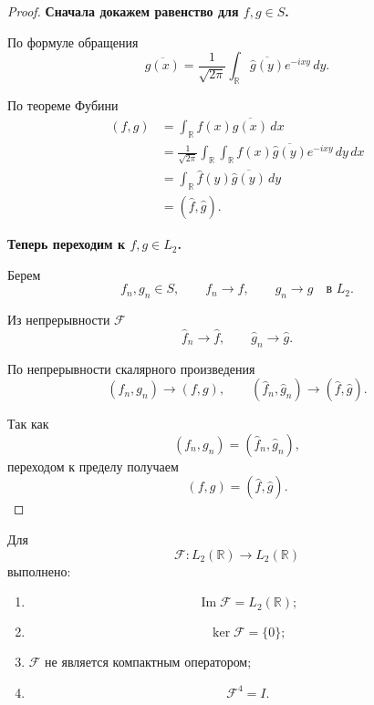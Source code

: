 \begin{proof}
	\textbf{Сначала докажем равенство для \(f,g\in S\).}
	
	По формуле обращения
	\[
	\overline{g(x)}
	=
	\frac{1}{\sqrt{2\pi}}
	\int_{\mathbb R}
	\overline{\widehat g(y)}e^{-ixy}\,dy.
	\]
	
	По теореме Фубини
	\[
	\begin{aligned}
		(f,g)
		&=
		\int_{\mathbb R}f(x)\overline{g(x)}\,dx
		\\
		&=
		\frac{1}{\sqrt{2\pi}}
		\int_{\mathbb R}\int_{\mathbb R}
		f(x)\overline{\widehat g(y)}e^{-ixy}\,dy\,dx
		\\
		&=
		\int_{\mathbb R}
		\widehat f(y)\overline{\widehat g(y)}\,dy
		\\
		&=
		(\widehat f,\widehat g).
	\end{aligned}
	\]
	
	\textbf{Теперь переходим к \(f,g\in L_2\).}
	
	Берем
	\[
	f_n,g_n\in S,
	\qquad
	f_n\to f,
	\qquad
	g_n\to g
	\quad\text{в }L_2.
	\]
	
	Из непрерывности \(\mathcal F\)
	\[
	\widehat f_n\to\widehat f,
	\qquad
	\widehat g_n\to\widehat g.
	\]
	
	По непрерывности скалярного произведения
	\[
	(f_n,g_n)\to(f,g),
	\qquad
	(\widehat f_n,\widehat g_n)
	\to
	(\widehat f,\widehat g).
	\]
	
	Так как
	\[
	(f_n,g_n)
	=
	(\widehat f_n,\widehat g_n),
	\]
	переходом к пределу получаем
	\[
	(f,g)=(\widehat f,\widehat g).
	\]
\end{proof}

\begin{theorem}
	Для
	\[
	\mathcal F:L_2(\mathbb R)\to L_2(\mathbb R)
	\]
	выполнено:
	\begin{enumerate}
		\item
		\[
		\operatorname{Im}\mathcal F=L_2(\mathbb R);
		\]
		
		\item
		\[
		\ker\mathcal F=\{0\};
		\]
		
		\item \(\mathcal F\) не является компактным оператором;
		
		\item
		\[
		\mathcal F^4=I.
		\]
	\end{enumerate}
\end{theorem}

